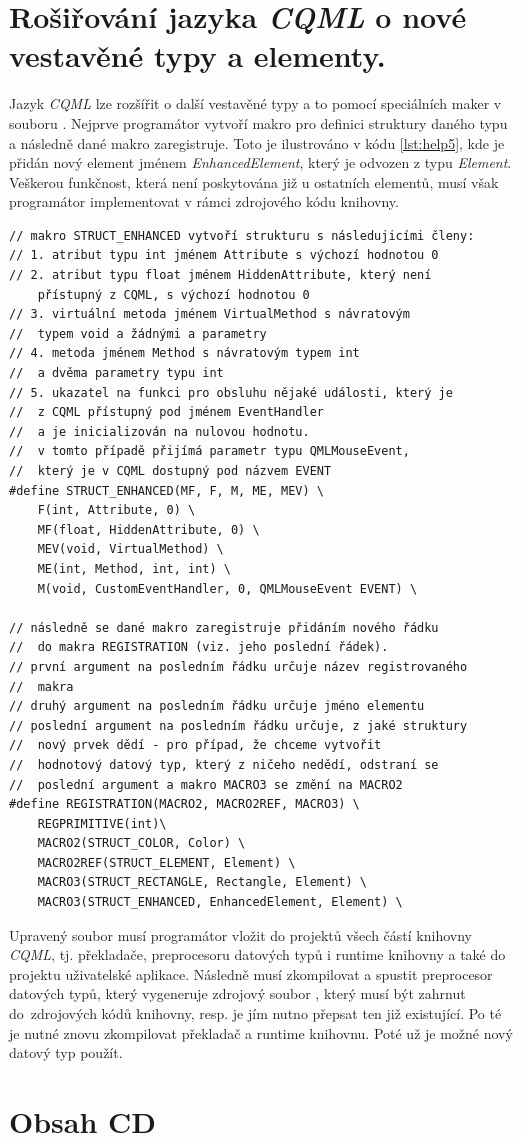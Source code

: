 \documentclass[11pt,twoside,a4paper]{book}
\begin{document}
\chapter[Rozšiřování \textit{CQML}]{\label{CH:APD}Rošiřování jazyka \textit{CQML} o nové vestavěné typy a elementy.}
Jazyk \textit{CQML} lze rozšířit o další vestavěné typy a to pomocí speciálních maker v souboru . Nejprve programátor vytvoří makro pro definici struktury daného typu a následně dané makro zaregistruje. Toto je ilustrováno v kódu \ref{lst:help5}, kde je přidán nový element jménem \textit{EnhancedElement}, který je odvozen z typu \textit{Element}. Veškerou funkčnost, která není poskytována již u ostatních elementů, musí však programátor implementovat v rámci zdrojového kódu knihovny.\\
\begin{lstlisting}[float, frame=single,caption=Registrace nového vestavěného datového typu.,label=lst:help5]
// makro STRUCT_ENHANCED vytvoří strukturu s následujicími členy:
// 1. atribut typu int jménem Attribute s výchozí hodnotou 0
// 2. atribut typu float jménem HiddenAttribute, který není 
	přístupný z CQML, s výchozí hodnotou 0
// 3. virtuální metoda jménem VirtualMethod s návratovým 
//	typem void a žádnými a parametry
// 4. metoda jménem Method s návratovým typem int 
//	a dvěma parametry typu int
// 5. ukazatel na funkci pro obsluhu nějaké události, který je
//	z CQML přístupný pod jménem EventHandler
//	a je inicializován na nulovou hodnotu. 
//	v tomto případě přijímá parametr typu QMLMouseEvent, 
//	který je v CQML dostupný pod názvem EVENT
#define STRUCT_ENHANCED(MF, F, M, ME, MEV) \
	F(int, Attribute, 0) \
	MF(float, HiddenAttribute, 0) \
	MEV(void, VirtualMethod) \
	ME(int, Method, int, int) \
	M(void, CustomEventHandler, 0, QMLMouseEvent EVENT) \

// následně se dané makro zaregistruje přidáním nového řádku 
// 	do makra REGISTRATION (viz. jeho poslední řádek).
// první argument na posledním řádku určuje název registrovaného
//	makra
// druhý argument na posledním řádku určuje jméno elementu
// poslední argument na posledním řádku určuje, z jaké struktury
//	nový prvek dědí - pro případ, že chceme vytvořit
//	hodnotový datový typ, který z ničeho nedědí, odstraní se 
//	poslední argument a makro MACRO3 se změní na MACRO2
#define REGISTRATION(MACRO2, MACRO2REF, MACRO3) \
	REGPRIMITIVE(int)\
	MACRO2(STRUCT_COLOR, Color) \
	MACRO2REF(STRUCT_ELEMENT, Element) \
	MACRO3(STRUCT_RECTANGLE, Rectangle, Element) \
	MACRO3(STRUCT_ENHANCED, EnhancedElement, Element) \ 
\end{lstlisting}
Upravený soubor \uv{struct\_definition\_macros.h} musí programátor vložit do projektů všech částí knihovny \textit{CQML}, tj. překladače, preprocesoru datových typů i runtime knihovny a také do projektu uživatelské aplikace. Následně musí zkompilovat a spustit preprocesor datových typů, který vygeneruje zdrojový soubor , který musí být zahrnut do~zdrojových kódů knihovny, resp. je jím nutno přepsat ten již existující. Po té je nutné znovu zkompilovat překladač a runtime knihovnu. Poté už je možné nový datový typ použít.

\chapter{\label{CH:APE}Obsah CD}
\end{document}
